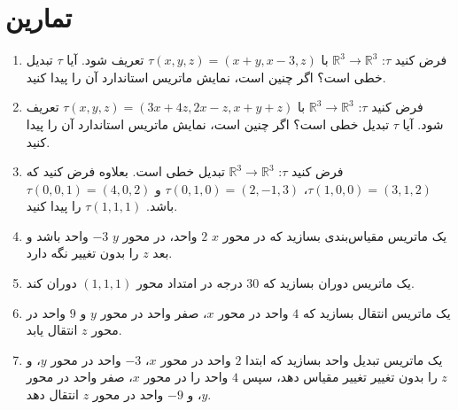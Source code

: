 \section{\textbf{تمارین}}
\label{sec:3.8}
{
    \Large
    \begin{spacing}{1.5}
        \begin{enumerate}[label=\textbf{\arabic*}.]
            \item {فرض کنید $\tau$:  $\mathbb{R}^3\rightarrow\mathbb{R}^3$ با $\tau(x,y,z)=(x+y,x-3,z)$ تعریف شود.
            آیا $\tau$ تبدیل خطی است؟ اگر چنین است، نمایش ماتریس استاندارد آن را پیدا کنید.} \\\textbf{\vspace{6pt}}

            \item {فرض کنید $\tau$:  $\mathbb{R}^3\rightarrow\mathbb{R}^3$ با $\tau(x,y,z)=(3x+4z, 2x-z, x+y+z)$ تعریف شود.
            آیا $\tau$ تبدیل خطی است؟ اگر چنین است، نمایش ماتریس استاندارد آن را پیدا کنید.} \\\textbf{\vspace{6pt}}

            \item {فرض کنید $\tau$:  $\mathbb{R}^3\rightarrow\mathbb{R}^3$ تبدیل خطی است.
            بعلاوه فرض کنید که $\tau(1,0,0)=(3,1,2)$، $\tau(0,1,0)=(2,-1,3)$ و $\tau(0,0,1)=(4,0,2)$ باشد. $\tau(1,1,1)$ را پیدا کنید.} \\\textbf{\vspace{6pt}}

            \item {یک ماتریس مقیاس‌بندی بسازید که در محور $x$ $2$ واحد، در محور $y$ $-3$ واحد باشد و بعد $z$ را بدون تغییر نگه دارد.} \\\textbf{\vspace{6pt}}

            \item {یک ماتریس دوران بسازید که $30$ درجه در امتداد محور $(1,1,1)$ دوران کند.} \\\textbf{\vspace{6pt}}

            \item {یک ماتریس انتقال بسازید که $4$ واحد در محور $x$، صفر واحد در محور $y$ و $9$ واحد در محور $z$ انتقال یابد.} \\\textbf{\vspace{6pt}}

            \item {یک ماتریس تبدیل واحد بسازید که ابتدا $2$ واحد در محور $x$، $-3$ واحد در محور $y$، و $z$ را بدون تغییر تغییر مقیاس دهد، سپس $4$ واحد را در محور $x$، صفر واحد در محور $y$، و $-9$ واحد در محور $z$ انتقال دهد.} \\\textbf{\vspace{6pt}}


\end{enumerate}
\end{spacing}}
